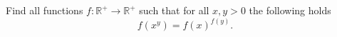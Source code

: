 Find all functions $f\colon\mathbb{R}^+ \rightarrow \mathbb{R}^+$ such that
for all $x,y>0$ the following holds
$$f(x^y)=f(x)^{f(y)}.$$